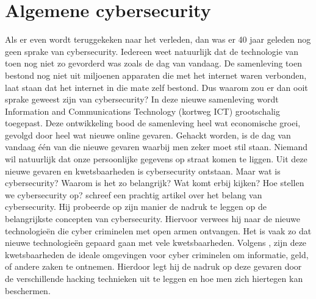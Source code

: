 \section{Algemene cybersecurity}
Als er even wordt teruggekeken naar het verleden, dan was er 40 jaar geleden nog geen sprake van cybersecurity. Iedereen weet natuurlijk dat de technologie van toen nog niet zo gevorderd was zoals de dag van vandaag. De samenleving toen bestond nog niet uit miljoenen apparaten die met het internet waren verbonden, laat staan dat het internet in die mate zelf bestond. Dus waarom zou er dan ooit sprake geweest zijn van cybersecurity?
\newline
\newline 
In deze nieuwe samenleving wordt Information and Communications Technology (kortweg ICT) grootschalig toegepast. Deze ontwikkeling bood de samenleving heel wat economische groei, gevolgd door heel wat nieuwe online gevaren. Gehackt worden, is de dag van vandaag één van die nieuwe gevaren waarbij men zeker moet stil staan. Niemand wil natuurlijk dat onze persoonlijke gegevens op straat komen te liggen. Uit deze nieuwe gevaren en kwetsbaarheden is cybersecurity ontstaan. Maar wat is cybersecurity? Waarom is het zo belangrijk? Wat komt erbij kijken? Hoe stellen we cybersecurity op?
\newline
\newline
\cite{AlexTarter2017} schreef een prachtig artikel over het belang van cybersecurity. Hij probeerde op zijn manier de nadruk te leggen op de belangrijkste concepten van cybersecurity. Hiervoor verwees hij naar de nieuwe technologieën die cyber criminelen met open armen ontvangen. Het is vaak zo dat nieuwe technologieën gepaard gaan met vele kwetsbaarheden. Volgens \cite{AlexTarter2017}, zijn deze kwetsbaarheden de ideale omgevingen voor cyber criminelen om informatie, geld, of andere zaken te ontnemen. Hierdoor legt hij de nadruk op deze gevaren door de verschillende hacking technieken uit te leggen en hoe men zich hiertegen kan beschermen. 

